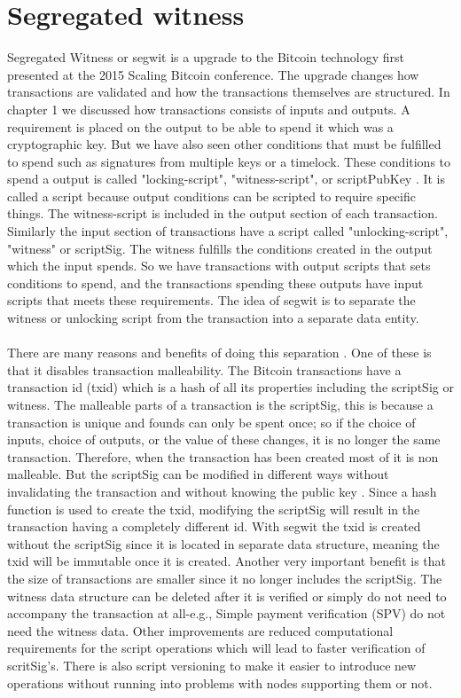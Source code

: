 \documentclass[informationsecurity]{gucmasterproject}
\begin{document}
\section{Segregated witness}
Segregated Witness or segwit is a upgrade to the Bitcoin technology first presented at the 2015 Scaling Bitcoin conference\cite{SB_segwit}. The upgrade changes how transactions are validated and how the transactions themselves are structured.
In chapter 1 we discussed how transactions consists of inputs and outputs. A requirement is placed on the output to be able to spend it which was a cryptographic key. But we have also seen other conditions that must be fulfilled to spend such as signatures from multiple keys or a timelock. These conditions to spend a output is called "locking-script", "witness-script", or scriptPubKey \cite{antonopoulos2017mastering}. It is called a script because output conditions can be scripted to require specific things. The witness-script is included in the output section of each transaction. Similarly the input section of transactions have a script called "unlocking-script", "witness" or scriptSig. The witness fulfills the conditions created in the output which the input spends. So we have transactions with output scripts that sets conditions to spend, and the transactions spending these outputs have input scripts that meets these requirements. The idea of segwit is to separate the witness or unlocking script from the transaction into a separate data entity. 

\paragraph{}
There are many reasons and benefits of doing this separation \cite{antonopoulos2017mastering}\cite{BC_segwit}. One of these is that it disables transaction malleability. The Bitcoin transactions have a transaction id (txid) which is a hash of all its properties including the scriptSig or witness. The malleable parts of a transaction is the scriptSig, this is because a transaction is unique and founds can only be spent once; so if the choice of inputs, choice of outputs, or the value of these changes, it is no longer the same transaction.
Therefore, when the transaction has been created most of it is non malleable. But the scriptSig can be modified in different ways without invalidating the transaction and without knowing the public key \cite{BIP62}. Since a hash function is used to create the txid, modifying the scriptSig will result in the transaction having a completely different id. With segwit the txid is created without the scriptSig since it is located in separate data structure, meaning the txid will be immutable once it is created. Another very important benefit is that the size of transactions are smaller since it no longer includes the scriptSig. The witness data structure can be deleted after it is verified or simply do not need to accompany the transaction at all-e.g., Simple payment verification (SPV) do not need the witness data.
Other improvements are reduced computational requirements for the script operations which will lead to faster verification of scritSig's.
There is also script versioning to make it easier to introduce new operations without running into problems with nodes supporting them or not.
\end{document}
